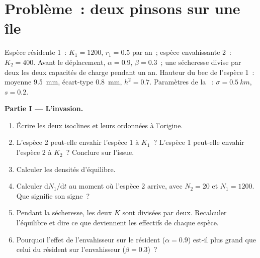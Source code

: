 \section{Problème~: deux pinsons sur une île}

\begin{problem}
\label{pb:b2:speciation:1}
Espèce résidente 1~: $K_1 = 1200$, $r_1 = 0.5$ par an~; espèce
envahissante 2~: $K_2 = 400$. Avant le déplacement, $\alpha = 0.9$, $\beta =
0.3$~; une sécheresse divise par deux les deux capacités de charge
pendant un an. Hauteur du bec de l'espèce 1~: moyenne \qty{9.5}{mm},
écart-type
\qty{0.8}{mm}, $h^{2} = 0.7$. Paramètres de la ~: $\sigma =
\qty{0.5}{km}$, $s = 0.2$.

\medskip
\noindent\textbf{Partie I --- L'invasion.}
\begin{enumerate}
  \item Écrire les deux isoclines et leurs ordonnées à l'origine.
  \item L'espèce 2 peut-elle envahir l'espèce 1 à $K_1$~? L'espèce 1
        peut-elle envahir l'espèce 2 à $K_2$~? Conclure sur l'issue.
  \item Calculer les densités d'équilibre.
  \item Calculer $\mathrm{d}N_1/\mathrm{d}t$ au moment où l'espèce 2
        arrive, avec $N_2 = 20$ et $N_1 = 1200$. Que signifie son signe~?
  \item Pendant la sécheresse, les deux $K$ sont divisées par deux.
        Recalculer l'équilibre et dire ce que deviennent les effectifs de
        chaque espèce.
  \item Pourquoi l'effet de l'envahisseur sur le résident ($\alpha = 0.9$)
        est-il plus grand que celui du résident sur l'envahisseur ($\beta = 0.3$)~?
\end{enumerate}


\end{problem}

